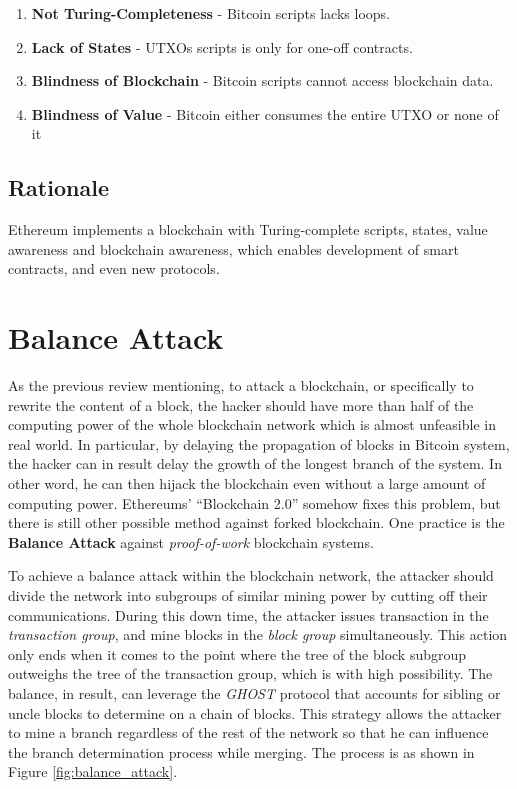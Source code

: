 \documentclass[12pt]{article}
\begin{document}
\begin{enumerate}
    \item \textbf{Not Turing-Completeness} - Bitcoin scripts lacks loops.
    \item \textbf{Lack of States} - UTXOs scripts is only for one-off contracts.
    \item \textbf{Blindness of Blockchain} - Bitcoin scripts cannot access blockchain data.
    \item \textbf{Blindness of Value} - Bitcoin either consumes the entire UTXO or none of it
\end{enumerate}

\subsection{Rationale}

Ethereum implements a blockchain with Turing-complete scripts, states, value awareness and blockchain awareness, which enables development of smart contracts, and even new protocols\cite{wood2014ethereum}.

\section{Balance Attack}
\label{sec:Balance Attack}

As the previous review mentioning, to attack a blockchain, or specifically to rewrite the content of a block, the hacker should have more than half of the computing power of the whole blockchain network which is almost unfeasible in real world. In particular, by delaying the propagation of blocks in Bitcoin system, the hacker can in result delay the growth of the longest branch of the system. In other word, he can then hijack the blockchain even without a large amount of computing power. Ethereums' ``Blockchain 2.0'' somehow fixes this problem, but there is still other possible method against forked blockchain. One practice is the \textbf{Balance Attack} \cite{Gra16}\cite{NG17}\cite{NG16}against \textit{proof-of-work} blockchain systems.

To achieve a balance attack within the blockchain network, the attacker should divide the network into subgroups of similar mining power by cutting off their communications. During this down time, the attacker issues transaction in the \textit{transaction group}, and mine blocks in the \textit{block group} simultaneously. This action only ends when it comes to the point where the tree of the block subgroup outweighs the tree of the transaction group, which is with high possibility. The balance, in result, can leverage the \textit{GHOST} protocol that accounts for sibling or uncle blocks to determine on a chain of blocks. This strategy allows the attacker to mine a branch regardless of the rest of the network so that he can influence the branch determination process while merging\cite{NG17}. The process is as shown in Figure \ref{fig:balance_attack}.
\end{document}
